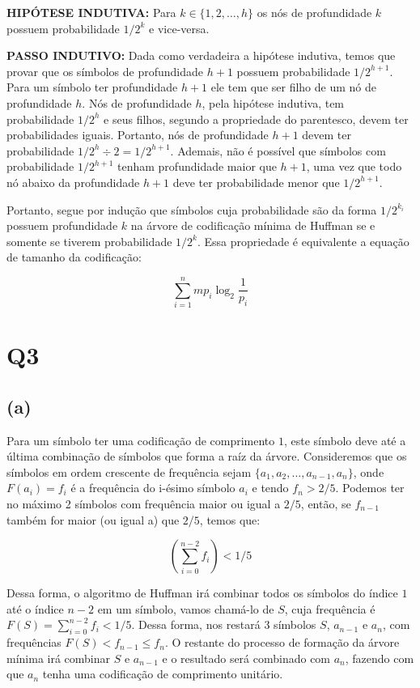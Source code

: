 \documentclass[12pt, a4paper]{article}
\begin{document}
\textbf{HIPÓTESE INDUTIVA:} Para $k \in \{1, 2, \ldots, h \}$ os nós de profundidade $k$ possuem probabilidade $1/2^k$ e vice-versa.

\textbf{PASSO INDUTIVO:} Dada como verdadeira a hipótese indutiva, temos que provar que os símbolos de profundidade $h+1$ possuem probabilidade $1/2^{h+1}$. Para um símbolo ter profundidade $h+1$ ele tem que ser filho de um nó de profundidade $h$. Nós de profundidade $h$, pela hipótese indutiva, tem probabilidade $1/2^h$ e seus filhos, segundo a propriedade do parentesco, devem ter probabilidades iguais. Portanto, nós de profundidade $h+1$ devem ter probabilidade $1/2^{h} \div 2 = 1/2^{h+1}$. Ademais, não é possível que símbolos com probabilidade $1/2^{h+1}$ tenham profundidade maior que $h+1$, uma vez que todo nó abaixo da profundidade $h+1$ deve ter probabilidade menor que $1/2^{h+1}$. 

Portanto, segue por indução que símbolos cuja probabilidade são da forma $1/2^{k_i}$ possuem profundidade $k$ na árvore de codificação mínima de Huffman se e somente se tiverem probabilidade $1/2^k$. Essa propriedade é equivalente a equação de tamanho da codificação:

\[ \sum_{i=1}^{n} mp_i \log_{2}{\frac{1}{p_i}} \]


\section*{Q3}

\subsection*{(a)}

Para um símbolo ter uma codificação de comprimento $1$, este símbolo deve  até a última combinação de símbolos que forma a raíz da árvore. Consideremos que os símbolos em ordem crescente de frequência sejam $\{a_1, a_2, \ldots, a_{n-1}, a_n\}$, onde $F(a_i)=f_i$ é a frequência do i-ésimo símbolo $a_i$ e tendo $f_n > 2/5$. Podemos ter no máximo 2 símbolos com frequência maior ou igual a $2/5$, então, se $f_{n-1}$ também for maior (ou igual a) que $2/5$, temos que:

\[ \left( \sum_{i=0}^{n-2} f_i \right) < 1/5\] 

Dessa forma, o algoritmo de Huffman irá combinar todos os símbolos do índice $1$ até o índice $n-2$ em um  símbolo, vamos chamá-lo de $S$, cuja frequência é $F(S) = \sum_{i=0}^{n-2} f_i < 1/5$. Dessa forma, nos restará 3 símbolos $S$, $a_{n-1}$ e $a_n$, com frequências $F(S) < f_{n-1} \leq f_n$. O restante do processo de formação da árvore mínima irá combinar $S$ e $a_{n-1}$ e o resultado será combinado com $a_n$, fazendo com que $a_n$ tenha uma codificação de comprimento unitário.
\end{document}

